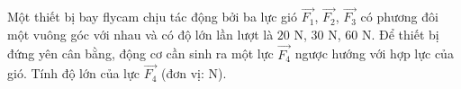 \begin{ex}
Một thiết bị bay flycam chịu tác động bởi ba lực gió $\overrightarrow{F_1}$, $\overrightarrow{F_2}$, $\overrightarrow{F_3}$ có phương đôi một vuông góc với nhau và có độ lớn lần lượt là $20$ N, $30$ N, $60$ N. Để thiết bị đứng yên cân bằng, động cơ cần sinh ra một lực $\overrightarrow{F_4}$ ngược hướng với hợp lực của gió. Tính độ lớn của lực $\overrightarrow{F_4}$ (đơn vị: N).
\end{ex}
